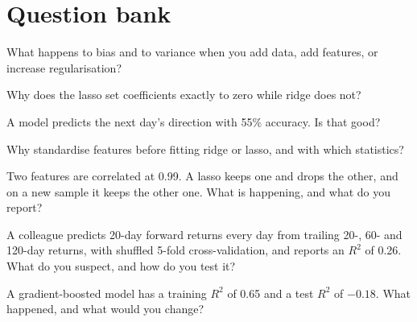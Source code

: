 \section{Question bank}

\begin{interviewq}\label{iq:iv:machine-learning:1}
What happens to bias and to variance when you add data, add features, or increase regularisation?
\end{interviewq}

\begin{interviewq}\label{iq:iv:machine-learning:2}
Why does the lasso set coefficients exactly to zero while ridge does not?
\end{interviewq}

\begin{interviewq}\label{iq:iv:machine-learning:3}
A model predicts the next day's direction with 55\% accuracy. Is that good?
\end{interviewq}

\begin{interviewq}\label{iq:iv:machine-learning:4}
Why standardise features before fitting ridge or lasso, and with which statistics?
\end{interviewq}

\begin{interviewq}\label{iq:iv:machine-learning:5}
Two features are correlated at 0.99. A lasso keeps one and drops the other, and on a new sample it keeps the other one.
What is happening, and what do you report?
\end{interviewq}

\begin{interviewq}\label{iq:iv:machine-learning:6}
A colleague predicts 20-day forward returns every day from trailing 20-, 60- and 120-day returns, with shuffled 5-fold
cross-validation, and reports an $R^2$ of 0.26. What do you suspect, and how do you test it?
\end{interviewq}

\begin{interviewq}\label{iq:iv:machine-learning:7}
A gradient-boosted model has a training $R^2$ of 0.65 and a test $R^2$ of $-0.18$. What happened, and what would you change?
\end{interviewq}

